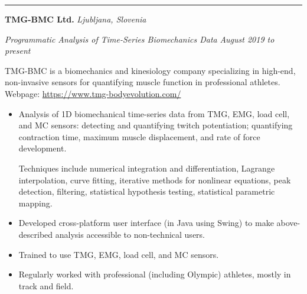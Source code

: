 \documentclass[10pt, a4paper]{article}
\newcommand{\rangesep}{to\xspace}  %
\renewcommand{\date}[1]{\textit{#1}}
\newcommand{\location}[1]{\textit{#1}}
\newcommand{\heading}[1]{
\makebox[0pt][l]{\Large \sc \hspace{2pt}#1}
\rule[-0.7ex]{\columnwidth}{0.5pt}\vspace{1.0ex}
}
\newcommand{\subheading}[1]{{\bfseries #1}}
\newenvironment{mysection}[1]
{\vspace{2.5ex}
\heading{#1}
\begin{adjustwidth}{0.3cm}{0cm}}
{\end{adjustwidth} }
\begin{document}
    \begin{mysection}{Employment}
        \subheading{TMG-BMC Ltd.} \hfill \location{Ljubljana, Slovenia}

        \textit{Programmatic Analysis of Time-Series Biomechanics Data} \hfill \date{August 2019 \rangesep present}

        \vspace{0.1ex}
        TMG-BMC is a biomechanics and kinesiology company specializing in high-end, non-invasive sensors for quantifying muscle function in professional athletes. Webpage: \url{https://www.tmg-bodyevolution.com/}

        \begin{itemize}
        
            \item Analysis of 1D biomechanical time-series data from TMG, EMG, load cell, and MC sensors: detecting and quantifying twitch potentiation; quantifying contraction time, maximum muscle displacement, and rate of force development.

            Techniques include numerical integration and differentiation, Lagrange interpolation, curve fitting, iterative methods for nonlinear equations, peak detection, filtering, statistical hypothesis testing, statistical parametric mapping.

            \item Developed cross-platform user interface (in Java using Swing) to make above-described analysis accessible to non-technical users.

            \item Trained to use TMG, EMG, load cell, and MC sensors.

            \item Regularly worked with professional (including Olympic) athletes, mostly in track and field.
        
        \end{itemize}
    \end{mysection}
\end{document}

